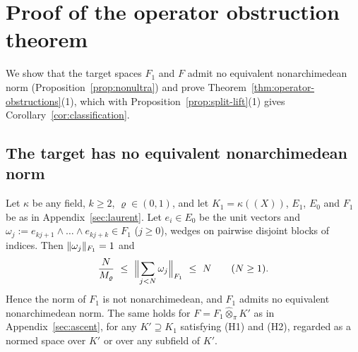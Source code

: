 \section{Proof of the operator obstruction theorem}\label{app:assembly}\label{sec:proofs}

We show that the target spaces $F_1$ and $F$ admit no equivalent nonarchimedean norm (Proposition~\ref{prop:nonultra}) and prove Theorem~\ref{thm:operator-obstructions}(1), which with Proposition~\ref{prop:split-lift}(1) gives Corollary~\ref{cor:classification}.

\subsection{The target has no equivalent nonarchimedean norm}

\begin{proposition}\label{prop:nonultra}
Let $\kappa$ be any field, $k\ge2$, $\varrho\in(0,1)$, and let $K_1=\kappa((X))$, $E_1$, $E_0$ and $F_1$ be as in
Appendix~\ref{sec:laurent}. Let $e_i\in E_0$ be the unit vectors and $\omega_j:=e_{kj+1}\wedge\dots\wedge e_{kj+k}\in F_1$
($j\ge0$), wedges on pairwise disjoint blocks of indices. Then $\lVert \omega_j\rVert_{F_1}=1$ and
\[
\frac N{M_\varrho}\ \le\ \Bigl\lVert\sum_{j<N}\omega_j\Bigr\rVert_{F_1}\ \le\ N\qquad(N\ge1).
\]
Hence the norm of $F_1$ is not nonarchimedean, and $F_1$ admits no equivalent nonarchimedean norm. The same holds for
$F=F_1\widehat\otimes_\pi K'$ as in Appendix~\ref{sec:ascent}, for any $K'\supseteq K_1$ satisfying \textup{(H1)} and \textup{(H2)},
regarded as a normed space over $K'$ or over any subfield of $K'$.
\end{proposition}

